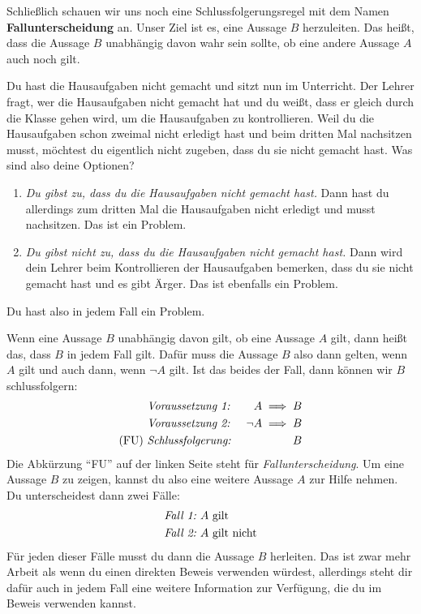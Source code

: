 \documentclass[../../main.tex]{subfiles}
\begin{document}
Schließlich schauen wir uns noch eine Schlussfolgerungsregel mit dem Namen \textbf{Fallunterscheidung} an. Unser Ziel ist es, eine Aussage $B$ herzuleiten. Das heißt, dass die Aussage $B$ unabhängig davon wahr sein sollte, ob eine andere Aussage $A$ auch noch gilt.

\begin{example}{}
    Du hast die Hausaufgaben nicht gemacht und sitzt nun im Unterricht. Der Lehrer fragt, wer die Hausaufgaben nicht gemacht hat und du weißt, dass er gleich durch die Klasse gehen wird, um die Hausaufgaben zu kontrollieren. Weil du die Hausaufgaben schon zweimal nicht erledigt hast und beim dritten Mal nachsitzen musst, möchtest du eigentlich nicht zugeben, dass du sie nicht gemacht hast. Was sind also deine Optionen?
    \begin{enumerate}
        \item \emph{Du gibst zu, dass du die Hausaufgaben nicht gemacht hast.} Dann hast du allerdings zum dritten Mal die Hausaufgaben nicht erledigt und musst nachsitzen. Das ist ein Problem.
        \item \emph{Du gibst nicht zu, dass du die Hausaufgaben nicht gemacht hast.} Dann wird dein Lehrer beim Kontrollieren der Hausaufgaben bemerken, dass du sie nicht gemacht hast und es gibt Ärger. Das ist ebenfalls ein Problem.
    \end{enumerate}
    Du hast also in jedem Fall ein Problem.
\end{example}

Wenn eine Aussage $B$ unabhängig davon gilt, ob eine Aussage $A$ gilt, dann heißt das, dass $B$ in jedem Fall gilt. Dafür muss die Aussage $B$ also dann gelten, wenn $A$ gilt und auch dann, wenn $\lnot A$ gilt. Ist das beides der Fall, dann können wir $B$ schlussfolgern:
\begin{align*}
    &\text{\emph{Voraussetzung~1:}}~&A \implies B\\
    &\text{\emph{Voraussetzung~2:}}~&\lnot A \implies B\\
    \text{(FU)}~&\text{\emph{Schlussfolgerung:}}~&B
\end{align*}
Die Abkürzung \enquote{FU} auf der linken Seite steht für \emph{Fallunterscheidung}. Um eine Aussage $B$ zu zeigen, kannst du also eine weitere Aussage $A$ zur Hilfe nehmen. Du unterscheidest dann zwei Fälle:
\begin{align*}
    \text{\emph{Fall~1:}}~&A~\text{gilt}\\
    \text{\emph{Fall~2:}}~&A~\text{gilt nicht}
\end{align*}
Für jeden dieser Fälle musst du dann die Aussage $B$ herleiten. Das ist zwar mehr Arbeit als wenn du einen direkten Beweis verwenden würdest, allerdings steht dir dafür auch in jedem Fall eine weitere Information zur Verfügung, die du im Beweis verwenden kannst.
\end{document}
